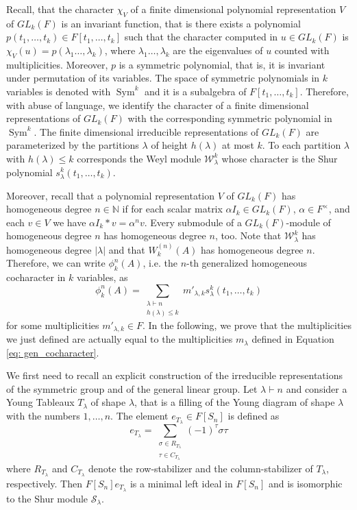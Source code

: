 \documentclass{article}
\newcommand{\bN}{\mathbb{N}}
\newcommand{\cS}{\mathcal{S}}
\newcommand{\cW}{\mathcal{W}}
\DeclareMathOperator{\Sym}{Sym}
\begin{document}
Recall, that the character $\chi_V$ of a finite dimensional polynomial representation $V$ of $GL_k(F)$ is an invariant function, that is there exists a polynomial $p(t_1,\dots,t_k)\in F[t_1,\dots,t_k]$ such that the character computed in $u\in GL_k(F)$ is $\chi_V(u)=p(\lambda_1\dots,\lambda_k)$, where $\lambda_1\dots,\lambda_k$ are the eigenvalues of $u$ counted with multiplicities. Moreover, $p$ is a symmetric polynomial, that is, it is invariant under permutation of its variables. The space of symmetric polynomials in $k$ variables is denoted with $\Sym^k$ and it is a subalgebra of $F[t_1,\dots,t_k]$. Therefore, with abuse  of language, we identify the character of a finite dimensional representations of $GL_k(F)$ with the corresponding symmetric polynomial in $\Sym^k$.
The finite dimensional irreducible representations of $GL_k(F)$ are parameterized by the partitions $\lambda$ of height $h(\lambda)$ at most $k$. To each partition $\lambda$ with $h(\lambda)\leq k$ corresponds the Weyl module $\cW^k_\lambda$ whose character is the Shur polynomial $s^{k}_\lambda(t_1,\dots,t_k)$.

Moreover, recall that a polynomial representation $V$ of $GL_k(F)$ has homogeneous degree $n\in\bN$ if for each scalar matrix $\alpha I_k \in GL_k(F)$, $\alpha \in F^\times$, and each $v\in V$ we have $\alpha I_k\ast v = \alpha^n v$. Every submodule of a $GL_k(F)$-module of homogeneous degree $n$ has homogeneous degree $n$, too. Note that $\cW^k_\lambda$ has homogeneous degree $|\lambda|$ and that $W^{(n)}_k(A)$ has homogeneous degree $n$. Therefore, we can write $\phi_k^n(A)$, i.e. the $n$-th generalized homogeneous cocharacter in $k$ variables, as \begin{equation}\label{eq: gen_coch_temp}
	\phi_k^n(A) = \sum_{\substack{\lambda\vdash n \\ h(\lambda)\leq k}} m'_{\lambda,k} s^k_\lambda(t_1,\dots,t_k)
\end{equation}
for some multiplicities $m'_{\lambda,k}\in F$. In the following, we prove that the multiplicities we just defined are actually equal to the multiplicities $m_\lambda$ defined in Equation \eqref{eq: gen_cocharacter}. 

We first need to recall an explicit construction of the irreducible representations of the symmetric group and of the general linear group. Let $\lambda\vdash n$ and consider a Young Tableaux $T_\lambda$ of shape $\lambda$, that is a filling of the Young diagram of shape $\lambda$ with the numbers $1,\dots,n$. The element $e_{T_\lambda}\in F[S_n]$ is defined as \begin{equation}\label{eq: e_T}
    e_{T_\lambda}=\sum_{\substack{\sigma \in R_{T_\lambda} \\ \tau \in C_{T_\lambda}}} (-1)^\tau \sigma \tau 
\end{equation}
where $R_{T_\lambda}$ and $C_{T_\lambda}$ denote the row-stabilizer and the column-stabilizer of $T_\lambda$, respectively. Then $F[S_n]e_{T_\lambda}$ is a minimal left ideal in $F[S_n]$ and is isomorphic to the Shur module $\cS_\lambda$.
\end{document}
